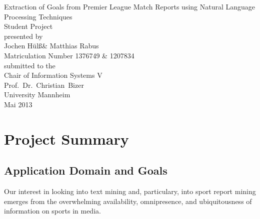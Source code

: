 \documentclass[11pt,titlepage,oneside,openany]{book}
\begin{document}
\begin{titlepage}
	\vspace*{2cm}
  \begin{center}
   {\Large Extraction of Goals from Premier League Match Reports using Natural Language Processing Techniques\\}
   \vspace{2cm} 
   {Student  Project\\}
   \vspace{2cm}
   {presented by\\
    Jochen H\"{u}l\ss \xspace  \&  Matthias Rabus \\
    Matriculation Number 1376749 \& 1207834 \\
   }
   \vspace{1cm} 
   {submitted to the\\
    Chair of Information Systems V\\
    Prof.\ Dr.\ Christian\ Bizer\\
    University Mannheim\\} \vspace{2cm}
   {Mai 2013}
  \end{center}
\end{titlepage} 

\tableofcontents
\newpage





\newpage



\chapter{Project Summary}
\section{Application Domain and Goals}
Our interest in looking into text mining and, particulary, into sport report mining emerges from the overwhelming availability, omnipresence, and ubiquitousness of information on sports in media.\p 
\end{document}
